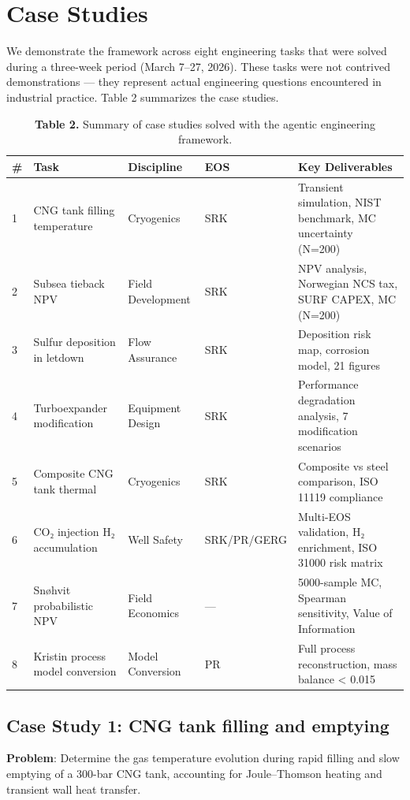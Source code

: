 \documentclass[review,3p]{elsarticle}
\begin{document}
\section{Case Studies}

We demonstrate the framework across eight engineering tasks that were solved during a three-week period (March 7–27, 2026). These tasks were not contrived demonstrations --- they represent actual engineering questions encountered in industrial practice. Table 2 summarizes the case studies.


\begin{table}[htbp]
\centering
\caption{\textbf{Table 2.} Summary of case studies solved with the agentic engineering framework.}
\begin{tabular}{lllll}
\toprule
# & Task & Discipline & EOS & Key Deliverables \\
\midrule
1 & CNG tank filling temperature & Cryogenics & SRK & Transient simulation, NIST benchmark, MC uncertainty (N=200) \\
2 & Subsea tieback NPV & Field Development & SRK & NPV analysis, Norwegian NCS tax, SURF CAPEX, MC (N=200) \\
3 & Sulfur deposition in letdown & Flow Assurance & SRK & Deposition risk map, corrosion model, 21 figures \\
4 & Turboexpander modification & Equipment Design & SRK & Performance degradation analysis, 7 modification scenarios \\
5 & Composite CNG tank thermal & Cryogenics & SRK & Composite vs steel comparison, ISO 11119 compliance \\
6 & CO₂ injection H₂ accumulation & Well Safety & SRK/PR/GERG & Multi-EOS validation, H₂ enrichment, ISO 31000 risk matrix \\
7 & Sn{\o}hvit probabilistic NPV & Field Economics & --- & 5000-sample MC, Spearman sensitivity, Value of Information \\
8 & Kristin process model conversion & Model Conversion & PR & Full process reconstruction, mass balance < 0.015%
\bottomrule
\end{tabular}
\end{table}

\subsection{Case Study 1: CNG tank filling and emptying}

\textbf{Problem}: Determine the gas temperature evolution during rapid filling and slow emptying of a 300-bar CNG tank, accounting for Joule–Thomson heating and transient wall heat transfer.
\end{document}
